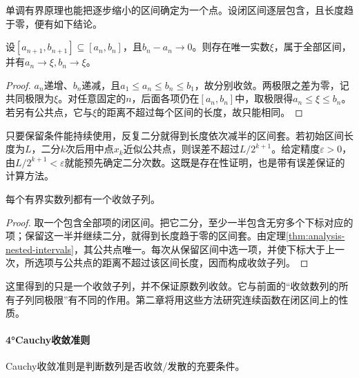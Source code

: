 单调有界原理也能把逐步缩小的区间确定为一个点。设闭区间逐层包含，且长度趋于零，便有如下结论。

\begin{theorem}[闭区间套定理]\label{thm:analysis-nested-intervals}
设\([a_{n+1},b_{n+1}]\subseteq[a_n,b_n]\)，且\(b_n-a_n\to0\)。则存在唯一实数\(\xi\)，属于全部区间，并有\(a_n\to\xi,b_n\to\xi\)。
\end{theorem}

\begin{proof}
\(a_n\)递增、\(b_n\)递减，且\(a_1\le a_n\le b_n\le b_1\)，故分别收敛。两极限之差为零，记共同极限为\(\xi\)。对任意固定的\(n\)，后面各项仍在\([a_n,b_n]\)中，取极限得\(a_n\le\xi\le b_n\)。若另有公共点，它与\(\xi\)的距离不超过每个区间的长度，故只能相同。
\end{proof}

只要保留条件能持续使用，反复二分就得到长度依次减半的区间套。若初始区间长度为\(L\)，二分\(k\)次后用中点\(x_k\)近似公共点，则误差不超过\(L/2^{k+1}\)。给定精度\(\varepsilon>0\)，由\(L/2^{k+1}<\varepsilon\)就能预先确定二分次数。这既是存在性证明，也是带有误差保证的计算方法。

\begin{theorem}\label{thm:analysis-bounded-subsequence}
每个有界实数列都有一个收敛子列。
\end{theorem}

\begin{proof}
取一个包含全部项的闭区间。把它二分，至少一半包含无穷多个下标对应的项；保留这一半并继续二分，就得到长度趋于零的区间套。由定理\ref{thm:analysis-nested-intervals}，其公共点唯一。每次从保留区间中选一项，并使下标大于上一次，所选项与公共点的距离不超过该区间长度，因而构成收敛子列。
\end{proof}

这里得到的只是一个收敛子列，并不保证原数列收敛。它与前面的“收敛数列的所有子列同极限”有不同的作用。第二章将用这些方法研究连续函数在闭区间上的性质。

\newpage
\paragraph{4°Cauchy收敛准则} \mbox{}

Cauchy收敛准则是判断数列是否收敛/发散的充要条件。

